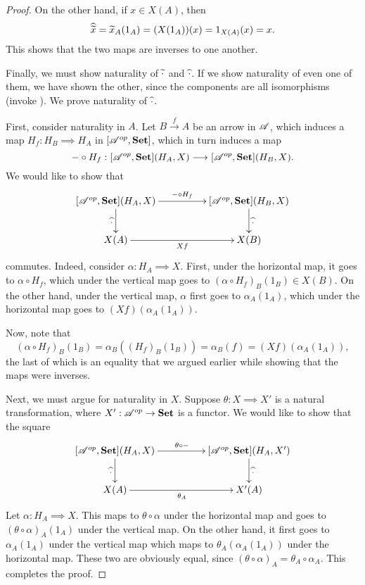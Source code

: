 \begin{proof}
    On the other hand, if $x\in X(A)$, then 
    \begin{equation*}
        \widehat{\widetilde{x}} = \widetilde{x}_A(1_A) = (X(1_A))(x) = 1_{X(A)}(x) = x.
    \end{equation*}
    This shows that the two maps are inverses to one another.

    Finally, we must show naturality of $\widetilde{\cdot}$ and $\widehat{\cdot}$. If we show naturality of even one of them, we have shown the other, since the components are all isomorphisms (invoke ). We prove naturality of $\widehat{\cdot}$.

    First, consider naturality in $A$. Let $B\xrightarrow{f} A$ be an arrow in $\mathscr A$, which induces a map $H_f: H_B\implies H_A$ in $[\mathscr A^{op},\mathbf{Set}]$, which in turn induces a map 
    \begin{equation*}
        -\circ H_f: [\mathscr A^{op}, \mathbf{Set}](H_A, X)\longrightarrow[\mathscr A^{op},\mathbf{Set}](H_B, X).
    \end{equation*}
    We would like to show that 
    \begin{equation*}
        \xymatrix@C+2pc {
            [\scrA^{op},\catSet](H_A, X)\ar[r]^{-\circ H_f}\ar[d]_{\wh{\cdot}} & [\scrA^{op},\catSet](H_B, X)\ar[d]^{\wh{\cdot}}\\
            X(A)\ar[r]_{Xf} & X(B)
        }
    \end{equation*}
    commutes. Indeed, consider $\alpha: H_A\implies X$. First, under the horizontal map, it goes to $\alpha\circ H_f$, which under the vertical map goes to $(\alpha\circ H_f)_B(1_B)\in X(B)$. On the other hand, under the vertical map, $\alpha$ first goes to $\alpha_A(1_A)$, which under the horizontal map goes to $(Xf)(\alpha_A(1_A))$.

    Now, note that 
    \begin{equation*}
        (\alpha\circ H_f)_B(1_B) = \alpha_B((H_f)_B(1_B)) = \alpha_B(f) = (Xf)(\alpha_A(1_A)),
    \end{equation*}
    the last of which is an equality that we argued earlier while showing that the maps were inverses.

    Next, we must argue for naturality in $X$. Suppose $\theta: X\implies X'$ is a natural transformation, where $X': \mathscr A^{op}\to\mathbf{Set}$ is a functor. We would like to show that the square 
    \begin{equation*}
        \xymatrix@C+2pc {
            [\scrA^{op},\catSet](H_A, X)\ar[r]^{\theta\circ-}\ar[d]_{\wh{\cdot}} & [\scrA^{op},\catSet](H_A, X')\ar[d]^{\wh{\cdot}}\\
            X(A)\ar[r]_{\theta_A} & X'(A)
        }
    \end{equation*}
    Let $\alpha: H_A\implies X$. This maps to $\theta\circ\alpha$ under the horizontal map and goes to $(\theta\circ\alpha)_A(1_A)$ under the vertical map. On the other hand, it first goes to $\alpha_A(1_A)$ under the vertical map which maps to $\theta_A(\alpha_A(1_A))$ under the horizontal map. These two are obviously equal, since $(\theta\circ\alpha)_A = \theta_A\circ\alpha_A$. This completes the proof.
\end{proof}

